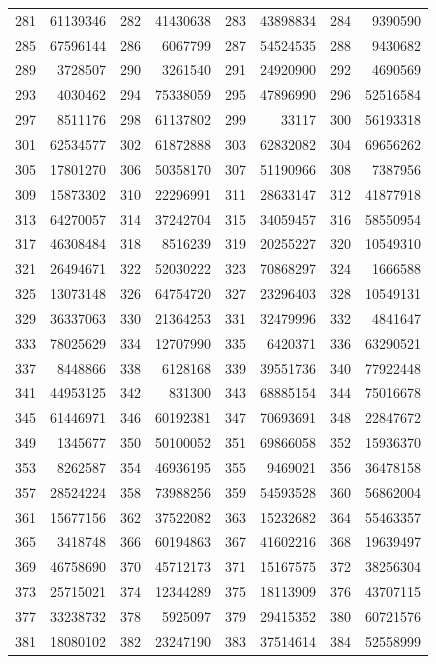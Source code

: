 \begin{longtable}{|r|r|r|r|r|r|r|r|}
281 & 61139346 & 282 & 41430638 & 283 & 43898834 & 284 & 9390590 \\
285 & 67596144 & 286 & 6067799 & 287 & 54524535 & 288 & 9430682 \\
289 & 3728507 & 290 & 3261540 & 291 & 24920900 & 292 & 4690569 \\
293 & 4030462 & 294 & 75338059 & 295 & 47896990 & 296 & 52516584 \\
297 & 8511176 & 298 & 61137802 & 299 & 33117 & 300 & 56193318 \\
301 & 62534577 & 302 & 61872888 & 303 & 62832082 & 304 & 69656262 \\
305 & 17801270 & 306 & 50358170 & 307 & 51190966 & 308 & 7387956 \\
309 & 15873302 & 310 & 22296991 & 311 & 28633147 & 312 & 41877918 \\
313 & 64270057 & 314 & 37242704 & 315 & 34059457 & 316 & 58550954 \\
317 & 46308484 & 318 & 8516239 & 319 & 20255227 & 320 & 10549310 \\
321 & 26494671 & 322 & 52030222 & 323 & 70868297 & 324 & 1666588 \\
325 & 13073148 & 326 & 64754720 & 327 & 23296403 & 328 & 10549131 \\
329 & 36337063 & 330 & 21364253 & 331 & 32479996 & 332 & 4841647 \\
333 & 78025629 & 334 & 12707990 & 335 & 6420371 & 336 & 63290521 \\
337 & 8448866 & 338 & 6128168 & 339 & 39551736 & 340 & 77922448 \\
341 & 44953125 & 342 & 831300 & 343 & 68885154 & 344 & 75016678 \\
345 & 61446971 & 346 & 60192381 & 347 & 70693691 & 348 & 22847672 \\
349 & 1345677 & 350 & 50100052 & 351 & 69866058 & 352 & 15936370 \\
353 & 8262587 & 354 & 46936195 & 355 & 9469021 & 356 & 36478158 \\
357 & 28524224 & 358 & 73988256 & 359 & 54593528 & 360 & 56862004 \\
361 & 15677156 & 362 & 37522082 & 363 & 15232682 & 364 & 55463357 \\
365 & 3418748 & 366 & 60194863 & 367 & 41602216 & 368 & 19639497 \\
369 & 46758690 & 370 & 45712173 & 371 & 15167575 & 372 & 38256304 \\
373 & 25715021 & 374 & 12344289 & 375 & 18113909 & 376 & 43707115 \\
377 & 33238732 & 378 & 5925097 & 379 & 29415352 & 380 & 60721576 \\
381 & 18080102 & 382 & 23247190 & 383 & 37514614 & 384 & 52558999 \\
\end{longtable}


